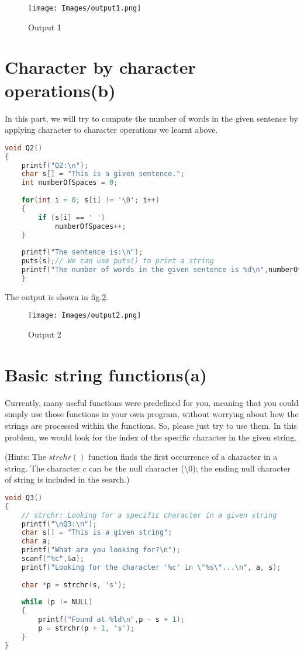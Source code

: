 \documentclass[12pt]{article}
\begin{document}
\begin{figure}[h]
\texttt{[image: Images/output1.png]} 
\caption{Output 1}
\label{output1}
\end{figure}


\section{Character by character operations(b)}
In this part, we will try to compute the number of words in the given sentence by applying character to character operations we learnt above.

\begin{lstlisting}[language=C, caption=Solution 2]
void Q2()
{
    printf("Q2:\n");
    char s[] = "This is a given sentence.";
    int numberOfSpaces = 0;
    
    for(int i = 0; s[i] != '\0'; i++)
    {
        if (s[i] == ' ')
            numberOfSpaces++;
    }
    
    printf("The sentence is:\n");
    puts(s);// We can use puts() to print a string
    printf("The number of words in the given sentence is %d\n",numberOfSpaces + 1);
    }
\end{lstlisting}
The output is shown in fig.\ref{output2}.
\begin{figure}[h]
\texttt{[image: Images/output2.png]} 
\caption{Output 2}
\label{output2}
\end{figure}

\section{Basic string functions(a)}

Currently, many useful functions were predefined for you, meaning that you could simply use those functions in your own program, without worrying about how the strings are processed within the functions. So, please just try to use them. In this problem, we would look for the index of the specific character in the given string. 

(Hints: The $strchr()$ function finds the first occurrence of a character in a string. The character $c$ can be the null character ($\setminus0$); the ending null character of string is included in the search.) 

\begin{lstlisting}[language=C, caption=Solution 3]
void Q3()
{
    // strchr: Looking for a specific character in a given string
    printf("\nQ3:\n");
    char s[] = "This is a given string";
    char a;
    printf("What are you looking for?\n");
    scanf("%c",&a);
    printf("Looking for the character '%c' in \"%s\"...\n", a, s);
    
    char *p = strchr(s, 's');
    
    while (p != NULL) 
    {
        printf("Found at %ld\n",p - s + 1);
        p = strchr(p + 1, 's');
    }
}
\end{lstlisting}
\end{document}
